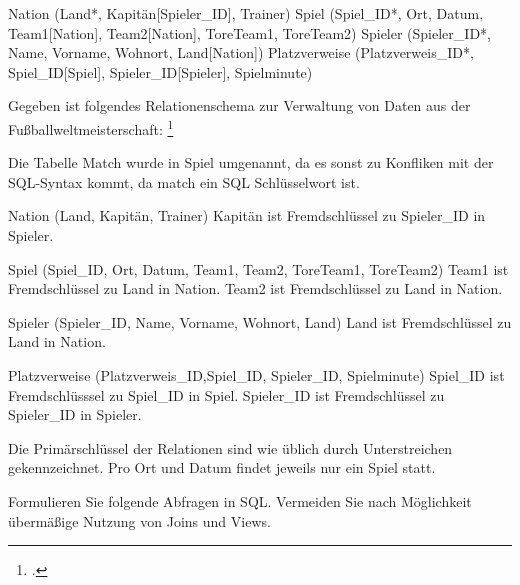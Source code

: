 \documentclass{bschlangaul-aufgabe}
\begin{document}

\begin{liRelationenSchemaFormat}
Nation (Land*, Kapitän[Spieler_ID], Trainer)
Spiel (Spiel_ID*, Ort, Datum, Team1[Nation], Team2[Nation], ToreTeam1, ToreTeam2)
Spieler (Spieler_ID*, Name, Vorname, Wohnort, Land[Nation])
Platzverweise (Platzverweis_ID*, Spiel_ID[Spiel], Spieler_ID[Spieler], Spielminute)
\end{liRelationenSchemaFormat}

Gegeben ist folgendes Relationenschema zur Verwaltung von Daten aus der
Fußballweltmeisterschaft:
\footcite{examen:66116:2021:03}

Die Tabelle Match wurde in Spiel umgenannt, da es sonst zu Konfliken mit
der SQL-Syntax kommt, da match ein SQL Schlüsselwort ist.

Nation (Land, Kapitän, Trainer)
Kapitän ist Fremdschlüssel zu Spieler\_ID in Spieler.

Spiel (Spiel\_ID, Ort, Datum, Team1, Team2, ToreTeam1, ToreTeam2)
Team1 ist Fremdschlüssel zu Land in Nation.
Team2 ist Fremdschlüssel zu Land in Nation.

Spieler (Spieler\_ID, Name, Vorname, Wohnort, Land)
Land ist Fremdschlüssel zu Land in Nation.

Platzverweise (Platzverweis\_ID,Spiel\_ID, Spieler\_ID, Spielminute)
Spiel\_ID ist Fremdschlüsssel zu Spiel\_ID in Spiel.
Spieler\_ID ist Fremdschlüssel zu Spieler\_ID in Spieler.

Die Primärschlüssel der Relationen sind wie üblich durch Unterstreichen
gekennzeichnet. Pro Ort und Datum findet jeweils nur ein Spiel statt.

Formulieren Sie folgende Abfragen in SQL. Vermeiden Sie nach Möglichkeit
übermäßige Nutzung von Joins und Views.
\end{document}
